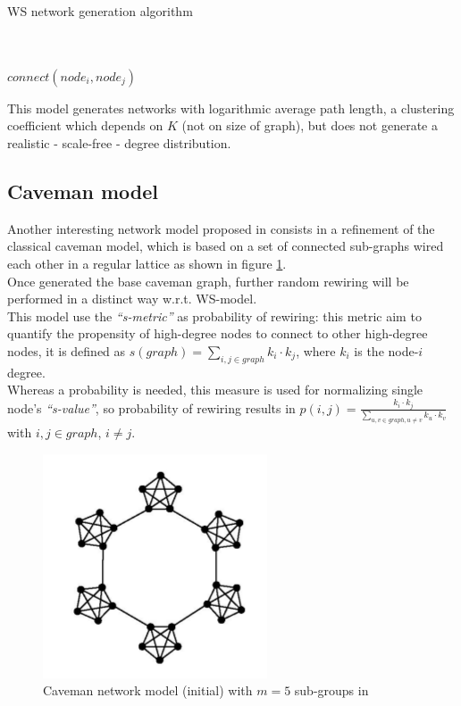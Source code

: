 \begin{algorithm}
\caption{WS network generation algorithm}
\label{sn_ws_alg}
\begin{algorithmic}
\STATE
{}\\
\\
	 		\STATE $connect(node_{i},node_{j})$
 		\ENDIF
 	\ENDFOR
\ENDFOR
\end{algorithmic}
\end{algorithm}

This model generates networks with logarithmic average path length, a clustering coefficient which depends on $K$ (not on size of graph), but does not generate a realistic - scale-free - degree distribution.

\subsection{Caveman model}
\label{sn_caveman_model}
Another interesting network model proposed in\cite{4149781} consists in a refinement of the classical caveman model, which is based on a set of connected sub-graphs wired each other in a regular lattice as shown in figure \ref{fig:caveman}.\\
 Once generated the base caveman graph, further random rewiring will be performed in a distinct way w.r.t. WS-model.\\
This model use the \emph{``s-metric''} as probability of rewiring: this metric aim to quantify the propensity of high-degree nodes to connect to other high-degree nodes, it is defined as $s(graph)=\sum_{i,j \in graph}{k_{i} \cdot k_{j}} $, where $k_{i}$ is the node-$i$ degree.\\
Whereas a probability is needed, this measure is used for normalizing single node's \emph{``s-value''}, so probability of rewiring results in $p(i,j) =\frac{k_{i} \cdot k_{j}}{\sum_{u,v \in graph, u \neq v}{k_{u} \cdot k_{v}}}$ with $i,j \in graph$, $i \neq j$.\\

\begin{figure}[h!]
	\begin{center}
    \includegraphics[scale=0.5]{img/caveman.png}
    \caption{Caveman network model (initial) with $m=5$ sub-groups in\cite{4149781} }
    \label{fig:caveman}
  \end{center}
\end{figure}

